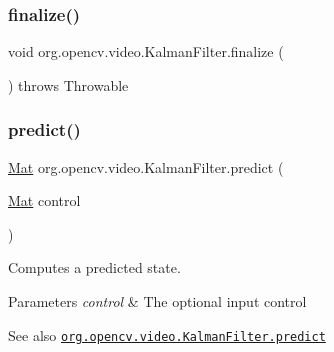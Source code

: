 \subsubsection{\texorpdfstring{finalize()}{finalize()}}
{\footnotesize\ttfamily void org.\+opencv.\+video.\+Kalman\+Filter.\+finalize (\begin{DoxyParamCaption}{ }\end{DoxyParamCaption}) throws Throwable\hspace{0.3cm}{\ttfamily [protected]}}

\mbox{\label{classorg_1_1opencv_1_1video_1_1_kalman_filter_a0a93554e79d5b33f3747247fde5d25f8}} 
\subsubsection{\texorpdfstring{predict()}{predict()}\hspace{0.1cm}{\footnotesize\ttfamily [1/2]}}
{\footnotesize\ttfamily \mbox{\hyperlink{classorg_1_1opencv_1_1core_1_1_mat}{Mat}} org.\+opencv.\+video.\+Kalman\+Filter.\+predict (\begin{DoxyParamCaption}\item[{\mbox{\hyperlink{classorg_1_1opencv_1_1core_1_1_mat}{Mat}}}]{control }\end{DoxyParamCaption})}

Computes a predicted state.


\begin{DoxyParams}{Parameters}
{\em control} & The optional input control\\
\hline
\end{DoxyParams}
\begin{DoxySeeAlso}{See also}
\href{http://docs.opencv.org/modules/video/doc/motion_analysis_and_object_tracking.html#kalmanfilter-predict}{\tt org.\+opencv.\+video.\+Kalman\+Filter.\+predict} 
\end{DoxySeeAlso}
\mbox{\label{classorg_1_1opencv_1_1video_1_1_kalman_filter_ab79a85e63d61abc81fba2e121104ddc9}} 
